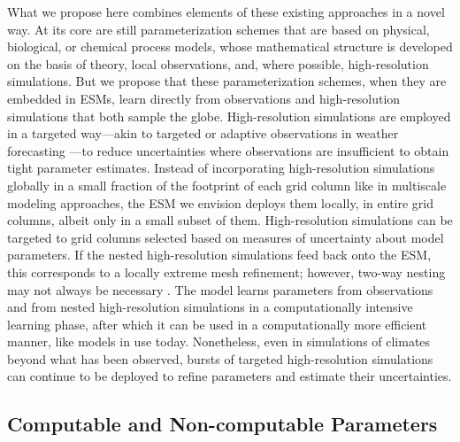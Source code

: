 \documentclass[draft]{agujournal}
\begin{document}
What we propose here combines elements of these existing approaches in a novel way. At its core are still parameterization schemes that are based on physical, biological, or chemical process models, whose mathematical structure is developed on the basis of theory, local observations, and, where possible, high-resolution simulations. But we propose that these parameterization schemes, when they are embedded in ESMs, learn directly from observations and high-resolution simulations that both sample the globe. High-resolution simulations are employed in a targeted way---akin to targeted or adaptive observations in weather forecasting \citep{Palmer98a,Lorenz98a,Bishop01a}---to reduce uncertainties where observations are insufficient to obtain tight parameter estimates. Instead of incorporating high-resolution simulations globally in a small fraction of the footprint of each grid column like in multiscale modeling approaches, the ESM we envision deploys them locally, in entire grid columns, albeit only in a small subset of them. High-resolution simulations can be targeted to grid columns selected based on measures of uncertainty about model parameters. If the nested high-resolution simulations feed back onto the ESM, this corresponds to a locally extreme mesh refinement; however, two-way nesting may not always be necessary \citep[e.g.,][]{Moeng07a,Zhu10a}. The model learns parameters from observations and from nested high-resolution simulations in a computationally intensive learning phase, after which it can be used in a computationally more efficient manner, like models in use today. Nonetheless, even in simulations of climates beyond what has been observed, bursts of targeted high-resolution simulations can continue to be deployed to refine parameters and estimate their uncertainties. 

\subsection{Computable and Non-computable Parameters}
\end{document}
